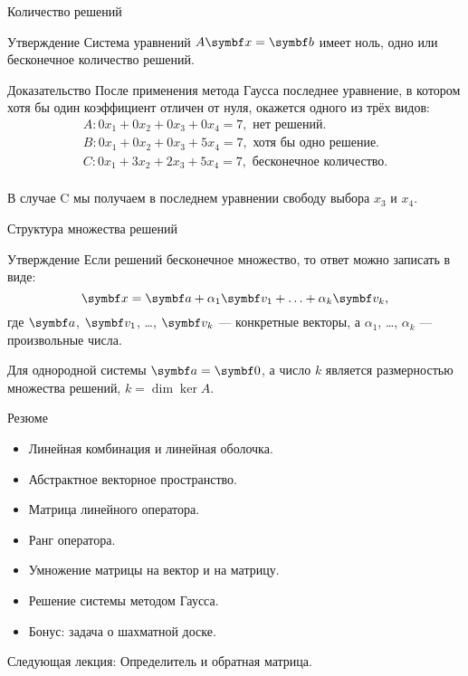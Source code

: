 \begin{frame}{Количество решений}
\begin{block}{Утверждение}
Система уравнений $A \bx = \bb$ имеет ноль, одно или бесконечное количество решений. 
\end{block}
\pause

\begin{block}{Доказательство}
После применения метода Гаусса последнее уравнение, в котором хотя бы один коэффициент 
отличен от нуля, окажется одного из трёх видов:
\[
\begin{array}{l}
A: 0x_1 + 0x_2 + 0x_3 + 0x_4 = 7, \text{ нет решений.}\\    
B: 0x_1 + 0x_2 + 0x_3 + 5x_4 = 7, \text{ хотя бы одно решение.} \\
C: 0x_1 + 3x_2 + 2x_3 + 5x_4 = 7, \text{ бесконечное количество.} \\
\end{array}
\]
\end{block}
\pause

В случае C мы получаем в последнем уравнении свободу выбора $x_3$ и $x_4$.

\end{frame}



\begin{frame}{Структура множества решений}

\begin{block}{Утверждение}
Если решений бесконечное множество, то ответ можно записать в виде:
\[
\bx = \ba + \alpha_1 \bv_1 + \ldots + \alpha_k \bv_k,
\]
где $\ba$, $\bv_1$, \ldots, $\bv_k$ — конкретные векторы, а
$\alpha_1$, \ldots, $\alpha_k$ — произвольные числа. 
\end{block}

\pause
Для однородной системы $\ba=\bzero$, 
    а число $k$ является размерностью множества решений, $k=\dim\ker A$.

\end{frame}




\begin{frame}{Резюме}


\begin{itemize}[<+->]
\item Линейная комбинация и линейная оболочка.
\item Абстрактное векторное пространство.
\item Матрица линейного оператора.
\item Ранг оператора. 
\item Умножение матрицы на вектор и на матрицу.
\item Решение системы методом Гаусса.
\item Бонус: задача о шахматной доске.
\end{itemize}
\pause
\alert{Следующая лекция:} Определитель и обратная матрица.



\end{frame}
    